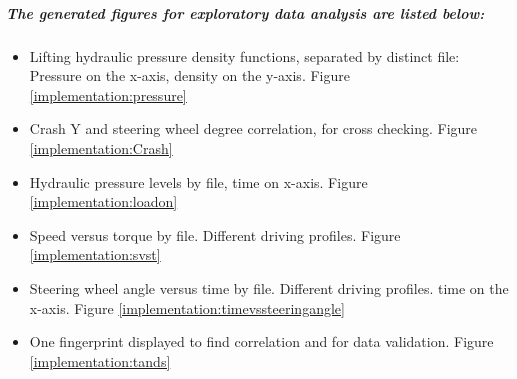 		\subparagraph{The generated figures for exploratory data analysis are listed below:}
		\begin{itemize}
			\item{Lifting hydraulic pressure density functions, separated by distinct file:} Pressure on the x-axis, density on the y-axis. Figure \ref{implementation:pressure}
			\item{Crash Y and steering wheel degree correlation, for cross checking. Figure \ref{implementation:Crash}}
			\item{Hydraulic pressure levels by file, time on x-axis. Figure \ref{implementation:loadon}}
			\item{Speed versus torque by file. Different driving profiles. Figure \ref{implementation:svst}}
			\item{Steering wheel angle versus time by file. Different driving profiles. time on the x-axis. Figure \ref{implementation:timevssteeringangle}}
			\item{One fingerprint displayed to find correlation and for data validation. Figure \ref{implementation:tands}}
		\end{itemize}

